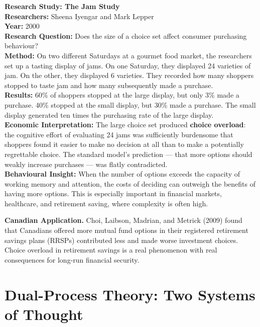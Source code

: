 \documentclass[12pt, letterpaper]{article}
\begin{document}
\begin{researchbox}
\textbf{Research Study: The Jam Study}\\[4pt]

\textbf{Researchers:} Sheena Iyengar and Mark Lepper\\[4pt]
\textbf{Year:} 2000\\[4pt]
\textbf{Research Question:} Does the size of a choice set affect consumer purchasing behaviour?\\[4pt]
\textbf{Method:} On two different Saturdays at a gourmet food market, the researchers set up a tasting display of jams. On one Saturday, they displayed 24 varieties of jam. On the other, they displayed 6 varieties. They recorded how many shoppers stopped to taste jam and how many subsequently made a purchase.\\[4pt]
\textbf{Results:} 60\% of shoppers stopped at the large display, but only 3\% made a purchase. 40\% stopped at the small display, but 30\% made a purchase. The small display generated ten times the purchasing rate of the large display.\\[4pt]
\textbf{Economic Interpretation:} The large choice set produced \textbf{choice overload}: the cognitive effort of evaluating 24 jams was sufficiently burdensome that shoppers found it easier to make no decision at all than to make a potentially regrettable choice. The standard model's prediction --- that more options should weakly increase purchases --- was flatly contradicted.\\[4pt]
\textbf{Behavioural Insight:} When the number of options exceeds the capacity of working memory and attention, the costs of deciding can outweigh the benefits of having more options. This is especially important in financial markets, healthcare, and retirement saving, where complexity is often high.\\[4pt]
\end{researchbox}

\textbf{Canadian Application.} Choi, Laibson, Madrian, and Metrick (2009) found that Canadians offered more mutual fund options in their registered retirement savings plans (RRSPs) contributed less and made worse investment choices. Choice overload in retirement savings is a real phenomenon with real consequences for long-run financial security.

\medskip


\section{Dual-Process Theory: Two Systems of Thought}
\end{document}
